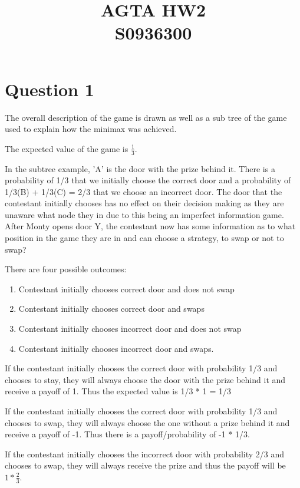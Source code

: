 \documentclass[11pt]{article}
\begin{document}
\title{AGTA HW2 \\ S0936300}

\maketitle

\section{Question 1}
The overall description of the game is drawn as well as a sub tree of the game used to explain how the minimax was achieved. 

The expected value of the game is $\frac{1}{3}$. 

In the subtree example, 'A' is the door with the prize behind it. There is a probability of 1/3 that we initially choose the correct door and a probability of 1/3(B) + 1/3(C) = 2/3 that we choose an incorrect door. The door that the contestant initially chooses has no effect on their decision making as they are unaware what node they in due to this being an imperfect information game. After Monty opens door Y, the contestant now has some information as to what position in the game they are in and can choose a strategy, to swap or not to swap?

There are four possible outcomes:

\begin{enumerate}
\item Contestant initially chooses correct door and does not swap
\item Contestant initially chooses correct door and swaps
\item Contestant initially chooses incorrect door and does not swap
\item Contestant initially chooses incorrect door and swaps.
\end{enumerate}

If the contestant initially chooses the correct door with probability 1/3 and chooses to stay, they will always choose the door with the prize behind it and receive a payoff of 1. Thus the expected value is 1/3 * 1 = 1/3

If the contestant initially chooses the correct door with probability 1/3 and chooses to swap, they will always choose the one without a prize behind it and receive a payoff of -1. Thus there is a payoff/probability of -1 * 1/3.

If the contestant initially chooses the incorrect door with probability 2/3 and chooses to swap, they will always receive the prize and thus the payoff will be $1 * \frac{2}{3}$.
\end{document}
